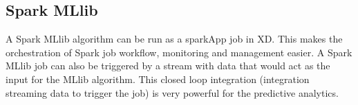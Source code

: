 \subsection{Spark MLlib}
A Spark MLlib algorithm can be run as a sparkApp job in XD. This makes the
orchestration of Spark job workflow, monitoring and management easier.
A Spark MLlib job can also be triggered by a stream with data that
would act as the input for the MLlib algorithm. This closed loop
integration (integration streaming data to trigger the job) is very powerful
for the predictive analytics.
